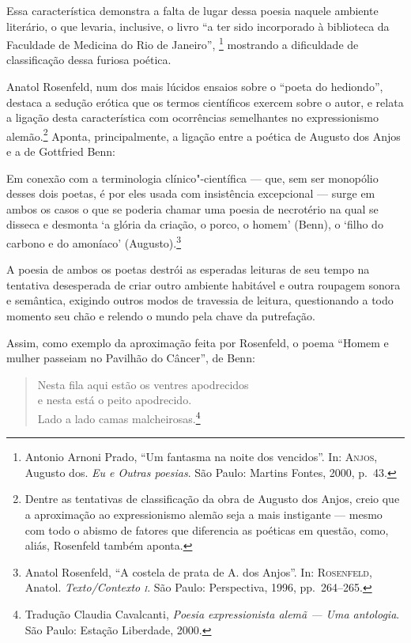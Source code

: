 \vfil\pagebreak

Essa característica demonstra a falta de lugar dessa poesia naquele
ambiente literário, o que levaria, inclusive, o livro “a ter sido
incorporado à biblioteca da Faculdade de Medicina do Rio de Janeiro”, 
\footnote{Antonio Arnoni Prado, “Um fantasma na noite dos vencidos”. In:
\textsc{Anjos}, Augusto dos. \textit{Eu e Outras poesias}. São Paulo:
Martins Fontes, 2000, p.~43.} mostrando a dificuldade de classificação dessa
furiosa poética. 

Anatol Rosenfeld, num dos mais lúcidos ensaios sobre o “poeta do
hediondo”, destaca a sedução erótica que os termos científicos
exercem sobre o autor, e relata a ligação desta característica com
ocorrências semelhantes no expressionismo alemão.\footnote{ Dentre as
tentativas de classificação da obra de Augusto dos Anjos, creio que a
aproximação ao expressionismo alemão seja a mais instigante --- mesmo com
todo o abismo de fatores que diferencia as poéticas em questão, como,
aliás, Rosenfeld também aponta.} Aponta, principalmente, a
ligação entre a poética de Augusto dos Anjos e a de Gottfried Benn:

\begin{hedraquote}
Em conexão com a terminologia clínico"-científica --- que, sem ser
monopólio desses dois poetas, é por eles usada com insistência
excepcional --- surge em ambos os casos o que se poderia chamar uma
poesia de necrotério na qual se disseca e desmonta `a glória da
criação, o porco, o homem' (Benn), o `filho do carbono e do amoníaco'
(Augusto).\footnote{Anatol Rosenfeld, “A costela de prata de A. dos Anjos”. In:
\textsc{Rosenfeld}, Anatol. \textit{Texto/Contexto \textsc{i}}. São Paulo:
Perspectiva, 1996, pp.~264--265.}
\end{hedraquote}

A poesia de ambos os poetas destrói as esperadas leituras de seu
tempo na tentativa desesperada de criar outro ambiente habitável e
outra roupagem sonora e semântica, exigindo outros modos de travessia
de leitura, questionando a todo momento seu chão e relendo o mundo pela
chave da putrefação.

Assim, como exemplo da aproximação feita por Rosenfeld, o poema
“Homem e mulher passeiam no Pavilhão do Câncer”, de Benn:

\begin{verse}
Nesta fila aqui estão os ventres apodrecidos\\
e nesta está o peito apodrecido.\\
Lado a lado camas malcheirosas.\footnote{ Tradução Claudia Cavalcanti, \textit{Poesia
expressionista alemã --- Uma antologia}. São Paulo: Estação Liberdade,
2000.}
\end{verse}

